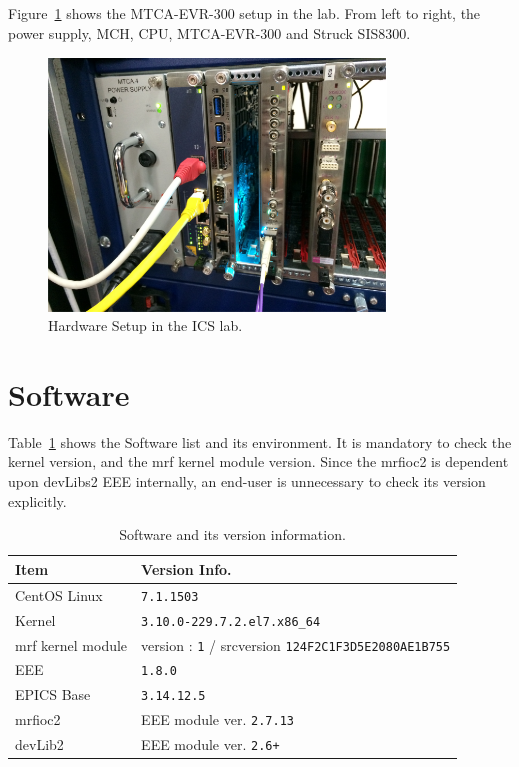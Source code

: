 \documentclass[11pt
  , a4paper
  , article
  , oneside
  , showtrims
]{memoir}
\begin{document}
Figure~\ref{fig:mtca-hw-setup} shows the MTCA-EVR-300 setup in the lab. From left to right, the power supply, MCH, CPU, MTCA-EVR-300 and Struck SIS8300.
\begin{figure}[!b]
  \centering
  \includegraphics[width=0.8\textwidth]{./pictures/mtca-hw-setup.eps}
  \caption{Hardware Setup in the ICS lab.}
  \label{fig:mtca-hw-setup}   
\end{figure}


\clearpage
\section{Software}
Table~\ref{table:swlist} shows the Software list and its environment. It is mandatory to check the kernel version, and the mrf kernel module version. Since the mrfioc2 is dependent upon devLibs2 EEE internally, an end-user is unnecessary to check its version explicitly. 
\begin{table}[!htb]
  \centering
  \begin{tabular}{l|l}
    \toprule
    Item               & Version Info.                                            \\\midrule
    CentOS Linux       & \texttt{7.1.1503}                                        \\\midrule
    Kernel             & \texttt{3.10.0-229.7.2.el7.x86\_64}                      \\\midrule
    mrf kernel module  & version : \texttt{1} / srcversion \texttt{124F2C1F3D5E2080AE1B755}     \\\midrule
    EEE                & \texttt{1.8.0}                                  \\\midrule
    EPICS Base         & \texttt{3.14.12.5}                              \\\midrule
    mrfioc2            & EEE module ver. \texttt{2.7.13}                 \\\midrule
    devLib2            & EEE module ver. \texttt{2.6+}                   \\\bottomrule
  \end{tabular}
  \caption[]{Software and its version information.}
  \label{table:swlist}
\end{table}
\end{document}

